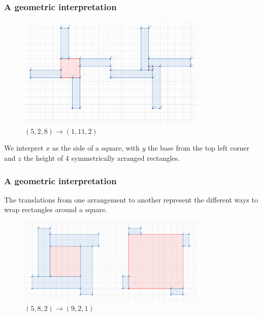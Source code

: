 \documentclass{beamer}
\begin{document}
\begin{frame}
	\frametitle{A geometric interpretation}
	\begin{figure}
	\begin{center}
             \includegraphics[width=0.8\textwidth]{windmill2.png}
        \end{center}
		\caption*{ $(5,2,8) \rightarrow (1,11,2)$}
                \label{fig:windmill2}
	\end{figure}

	We interpret $x$ as the side of a square, with $y$ the base from the top left corner and
	$z$ the height of 4 symmetrically arranged rectangles.
\end{frame}

\begin{frame}
	\frametitle{A geometric interpretation}
	The translations from one arrangement to another represent the different ways to wrap
	rectangles around a square.
	\begin{figure}
	\begin{center}
             \includegraphics[width=0.8\textwidth]{windmill1.png}
        \end{center}
	\caption*{ $(5,8,2) \rightarrow (9,2,1)$}
                \label{fig:windmill1}
	\end{figure}
\end{frame}
\end{document}
